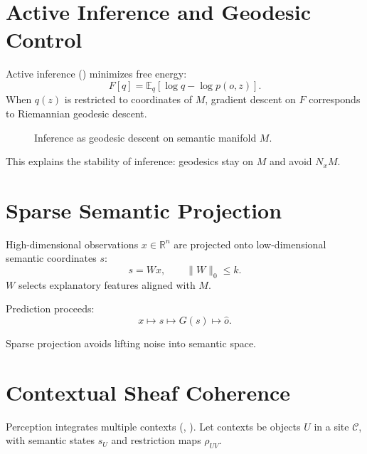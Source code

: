 \documentclass[11pt,a4paper,twocolumn]{article}
\begin{document}
\section{Active Inference and Geodesic Control}

Active inference (\cite{friston2010free})
minimizes free energy:
\[
F[q] = \mathbb{E}_q[\log q - \log p(o,z)].
\]
When $q(z)$ is restricted to coordinates of $M$,
gradient descent on $F$ corresponds to 
Riemannian geodesic descent.

\begin{figure}[H]
\centering
{}
\caption{Inference as geodesic descent on semantic manifold $M$.}
\end{figure}

This explains the stability of inference:
geodesics stay on $M$ and avoid $N_x M$.

\section{Sparse Semantic Projection}

High-dimensional observations $x\in\mathbb{R}^n$
are projected onto low-dimensional semantic coordinates $s$:
\[
s = W x,\qquad \|W\|_0\le k.
\]
$W$ selects explanatory features aligned with $M$.

Prediction proceeds:
\[
x \mapsto s \mapsto G(s) \mapsto \hat o.
\]

Sparse projection avoids lifting noise
into semantic space.

\section{Contextual Sheaf Coherence}

Perception integrates multiple contexts 
(\cite{maclane1992sheaves}, \cite{abramsky2011sheaf}).
Let contexts be objects $U$ in a site $\mathcal{C}$,
with semantic states $s_U$
and restriction maps $\rho_{UV}$.
\end{document}
